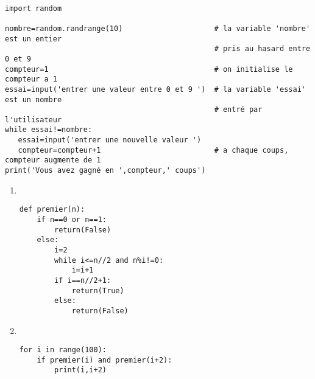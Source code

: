 \newpage


\begin{solution}~\\
\vspace{-1cm}
\begin{verbatim}
import random

nombre=random.randrange(10)                     # la variable 'nombre' est un entier 
                                                # pris au hasard entre 0 et 9
compteur=1                                      # on initialise le compteur a 1              
essai=input('entrer une valeur entre 0 et 9 ')  # la variable 'essai' est un nombre 
                                                # entré par l'utilisateur
while essai!=nombre:
   essai=input('entrer une nouvelle valeur ')
   compteur=compteur+1                          # a chaque coups, compteur augmente de 1
print('Vous avez gagné en ',compteur,' coups')	
\end{verbatim}
\end{solution}
\bigskip

\begin{solution}
\begin{enumerate}
\item ~\\
\vspace{-0.7cm} \begin{verbatim}
def premier(n):
    if n==0 or n==1:
        return(False)
    else:
        i=2
        while i<=n//2 and n%i!=0:
            i=i+1
        if i==n//2+1:
            return(True)
        else:
            return(False)
\end{verbatim}            
\item ~\\
\vspace{-0.7cm}     
\begin{verbatim}
for i in range(100):
    if premier(i) and premier(i+2):
        print(i,i+2)
\end{verbatim}
\end{enumerate}
\end{solution}
\bigskip



